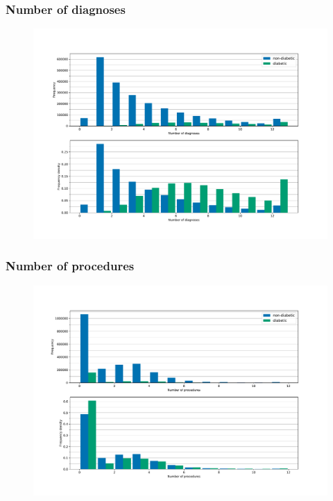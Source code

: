 \documentclass{beamer}
\begin{document}
\begin{frame}
    \frametitle{Number of diagnoses}
   
    \begin{figure}
    \includegraphics[width=\linewidth]{./img/diabetic_diag_no_joint_hist.pdf}
    \end{figure}
\end{frame}

\begin{frame}
    \frametitle{Number of procedures}

    \begin{figure}
    \includegraphics[width=\linewidth]{./img/diabetic_proc_no_joint_hist.pdf}
    \end{figure}
\end{frame}
\end{document}
